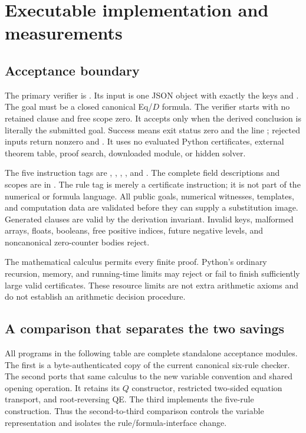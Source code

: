 \section{Executable implementation and measurements}
\label{sec:implementation}

\subsection{Acceptance boundary}
The primary verifier is . Its input is one JSON object with exactly the keys  and . The goal must be a closed canonical Eq/$D$ formula. The verifier starts with no retained clause and free scope zero. It accepts only when the derived conclusion is literally the submitted goal. Success means exit status zero and the line ; rejected inputs return nonzero and . It uses no evaluated Python certificates, external theorem table, proof search, downloaded module, or hidden solver.

The five instruction tags are , , , , and . The complete field descriptions and scopes are in . The rule tag is merely a certificate instruction; it is not part of the numerical or formula language. All public goals, numerical witnesses, templates, and computation data are validated before they can supply a substitution image. Generated clauses are valid by the derivation invariant. Invalid keys, malformed arrays, floats, booleans, free positive indices, future negative levels, and noncanonical zero-counter bodies reject.

The mathematical calculus permits every finite proof. Python's ordinary recursion, memory, and running-time limits may reject or fail to finish sufficiently large valid certificates. These resource limits are not extra arithmetic axioms and do not establish an arithmetic decision procedure.

\subsection{A comparison that separates the two savings}
All programs in the following table are complete standalone acceptance modules. The first is a byte-authenticated copy of the current canonical six-rule checker. The second ports that same calculus to the new variable convention and shared opening operation. It retains its $Q$ constructor, restricted two-sided equation transport, and root-reversing QE. The third implements the five-rule construction. Thus the second-to-third comparison controls the variable representation and isolates the rule/formula-interface change.

